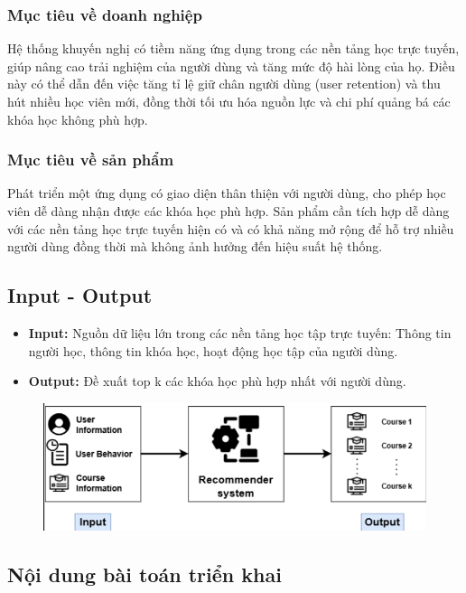 \subsubsection{Mục tiêu về doanh nghiệp}
Hệ thống khuyến nghị có tiềm năng ứng dụng trong các nền tảng học trực tuyến, giúp nâng cao trải nghiệm của người dùng và tăng mức độ hài lòng của họ. Điều này có thể dẫn đến việc tăng tỉ lệ giữ chân người dùng (user retention) và thu hút nhiều học viên mới, đồng thời tối ưu hóa nguồn lực và chi phí quảng bá các khóa học không phù hợp.
\subsubsection{Mục tiêu về sản phẩm}
Phát triển một ứng dụng có giao diện thân thiện với người dùng, cho phép học viên dễ dàng nhận được các khóa học phù hợp. Sản phẩm cần tích hợp dễ dàng với các nền tảng học trực tuyến hiện có và có khả năng mở rộng để hỗ trợ nhiều người dùng đồng thời mà không ảnh hưởng đến hiệu suất hệ thống.
\subsection{Input - Output}
\begin{itemize}
    \item \textbf{Input:} Nguồn dữ liệu lớn trong các nền tảng học tập trực tuyến: Thông tin người học, thông tin khóa học, hoạt động học tập của người dùng.
    \item \textbf{Output:} Đề xuất top k các khóa học phù hợp nhất với người dùng.
\end{itemize}
\begin{figure}[h]
    \centering
    \includegraphics[width=0.75\linewidth]{figures/55.png}
\end{figure}
\subsection{Nội dung bài toán triển khai}
